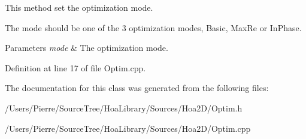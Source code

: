 This method set the optimization mode. 

The mode should be one of the 3 optimization modes, Basic, Max\-Re or In\-Phase.


\begin{DoxyParams}{Parameters}
{\em mode} & The optimization mode. \\
\hline
\end{DoxyParams}


Definition at line 17 of file Optim.\-cpp.



The documentation for this class was generated from the following files\-:\begin{DoxyCompactItemize}
\item 
/\-Users/\-Pierre/\-Source\-Tree/\-Hoa\-Library/\-Sources/\-Hoa2\-D/Optim.\-h\item 
/\-Users/\-Pierre/\-Source\-Tree/\-Hoa\-Library/\-Sources/\-Hoa2\-D/Optim.\-cpp\end{DoxyCompactItemize}
